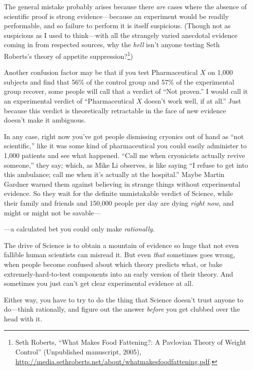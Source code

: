 {
 The general mistake probably arises because there \textit{are}
cases where the absence of scientific proof is strong
evidence---because an experiment would be readily performable, and so
failure to perform it is itself suspicious. (Though not as suspicious
as I used to think---with all the strangely varied anecdotal evidence
coming in from respected sources, why the \textit{hell}
isn't anyone testing Seth Roberts's
theory of appetite suppression?\footnote{Seth Roberts, ``What Makes Food Fattening?: A
Pavlovian Theory of Weight Control'' (Unpublished
manuscript, 2005),
\url{http://media.sethroberts.net/about/whatmakesfoodfattening.pdf}.})}

{
 Another confusion factor may be that if you test Pharmaceutical $X$
on 1,000 subjects and find that 56\% of the control group and 57\% of
the experimental group recover, some people will call that a verdict of
``Not proven.'' I would call it an
experimental verdict of ``Pharmaceutical $X$
doesn't work well, if at all.'' Just
because this verdict is theoretically retractable in the face of new
evidence doesn't make it ambiguous.}

{
 In any case, right now you've got people
dismissing cryonics out of hand as ``not
scientific,'' like it was some kind of pharmaceutical
you could easily administer to 1,000 patients and see what happened.
``Call me when cryonicists actually revive
someone,'' they say; which, as Mike Li observes, is
like saying ``I refuse to get into this ambulance;
call me when it's actually at the
hospital.'' Maybe Martin Gardner warned them against
believing in strange things without experimental evidence. So they wait
for the definite unmistakable verdict of Science, while their family
and friends and 150,000 people per day are dying \textit{right now},
and might or might not be savable---}

{
 {}---a calculated bet you could only make \textit{rationally.}}

{
 The drive of Science is to obtain a mountain of evidence so huge
that not even fallible human scientists can misread it. But even
\textit{that} sometimes goes wrong, when people become confused about
which theory predicts what, or bake extremely-hard-to-test components
into an early version of their theory. And sometimes you just
can't get clear experimental evidence at all.}

{
 Either way, you have to try to do the thing that Science
doesn't trust anyone to do---think rationally, and
figure out the answer \textit{before} you get clubbed over the head
with it.}

